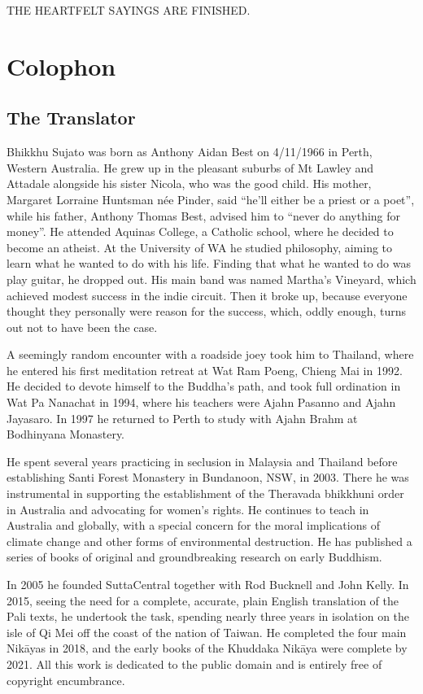 \documentclass[12pt,openany]{book}%
\newcommand*{\scendbook}[1]{\begin{center}\uppercase{#1}\end{center}}
\let\oldbackmatter\backmatter
\renewcommand{\backmatter}{%
\chapterfont{\setstretch{.85}\normalfont\centering}%
\sectionfont{\setstretch{.85}\Semiboldsubheadfont}%
\oldbackmatter}
\begin{document}
\scendbook{The Heartfelt Sayings are finished. }

%
\backmatter%
%
\chapter*{Colophon}

\section*{The Translator}

Bhikkhu Sujato was born as Anthony Aidan Best on 4/11/1966 in Perth, Western Australia. He grew up in the pleasant suburbs of Mt Lawley and Attadale alongside his sister Nicola, who was the good child. His mother, Margaret Lorraine Huntsman née Pinder, said “he’ll either be a priest or a poet”, while his father, Anthony Thomas Best, advised him to “never do anything for money”. He attended Aquinas College, a Catholic school, where he decided to become an atheist. At the University of WA he studied philosophy, aiming to learn what he wanted to do with his life. Finding that what he wanted to do was play guitar, he dropped out. His main band was named Martha’s Vineyard, which achieved modest success in the indie circuit. Then it broke up, because everyone thought they personally were reason for the success, which, oddly enough, turns out not to have been the case. 

A seemingly random encounter with a roadside joey took him to Thailand, where he entered his first meditation retreat at Wat Ram Poeng, Chieng Mai in 1992. He decided to devote himself to the Buddha’s path, and took full ordination in Wat Pa Nanachat in 1994, where his teachers were Ajahn Pasanno and Ajahn Jayasaro. In 1997 he returned to Perth to study with Ajahn Brahm at Bodhinyana Monastery. 

He spent several years practicing in seclusion in Malaysia and Thailand before establishing Santi Forest Monastery in Bundanoon, NSW, in 2003. There he was instrumental in supporting the establishment of the Theravada bhikkhuni order in Australia and advocating for women’s rights. He continues to teach in Australia and globally, with a special concern for the moral implications of climate change and other forms of environmental destruction. He has published a series of books of original and groundbreaking research on early Buddhism. 

In 2005 he founded SuttaCentral together with Rod Bucknell and John Kelly. In 2015, seeing the need for a complete, accurate, plain English translation of the Pali texts, he undertook the task, spending nearly three years in isolation on the isle of Qi Mei off the coast of the nation of Taiwan. He completed the four main \textsanskrit{Nikāyas} in 2018, and the early books of the Khuddaka \textsanskrit{Nikāya} were complete by 2021. All this work is dedicated to the public domain and is entirely free of copyright encumbrance. 
\end{document}
